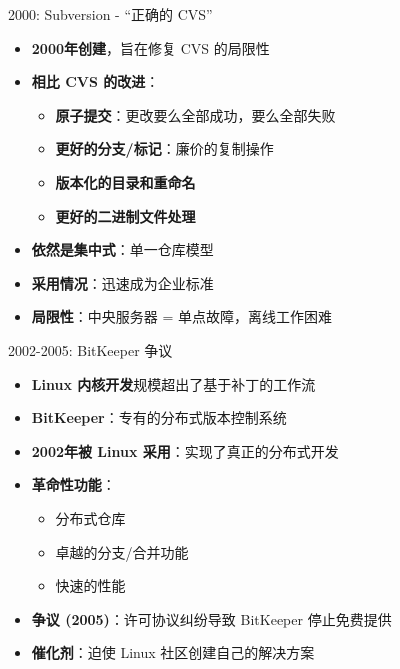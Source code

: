 \documentclass{beamer}
\begin{document}
\begin{frame}[t]{2000: Subversion - “正确的 CVS”}
\begin{itemize}
    \item \textbf{2000年创建}，旨在修复 CVS 的局限性
    \item \textbf{相比 CVS 的改进}：
        \begin{itemize}
            \item \textbf{原子提交}：更改要么全部成功，要么全部失败
            \item \textbf{更好的分支/标记}：廉价的复制操作
            \item \textbf{版本化的目录和重命名}
            \item \textbf{更好的二进制文件处理}
        \end{itemize}
    \item \textbf{依然是集中式}：单一仓库模型
    \item \textbf{采用情况}：迅速成为企业标准
    \item \textbf{局限性}：中央服务器 = 单点故障，离线工作困难
\end{itemize}
\end{frame}

\begin{frame}[t]{2002-2005: BitKeeper 争议}
        \begin{itemize}
            \item \textbf{Linux 内核开发}规模超出了基于补丁的工作流
            \item \textbf{BitKeeper}：专有的分布式版本控制系统
            \item \textbf{2002年被 Linux 采用}：实现了真正的分布式开发
            \item \textbf{革命性功能}：
                \begin{itemize}
                    \item 分布式仓库
                    \item 卓越的分支/合并功能
                    \item 快速的性能
                \end{itemize}
            \item \textbf{争议 (2005)}：许可协议纠纷导致 BitKeeper 停止免费提供
            \item \textbf{催化剂}：迫使 Linux 社区创建自己的解决方案
        \end{itemize}
\end{frame}
\end{document}
